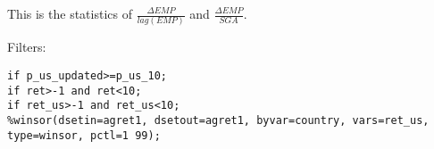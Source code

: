 





\thispagestyle{fancy}

\newcommand{\code}{\texttt}
\newcommand*{\Commonpath}{20181227}

This is the statistics of $\frac{\Delta EMP}{lag(EMP)}$ and $\frac{\Delta EMP}{SGA}$.

Filters:

\code{if p\_us\_updated>=p\_us\_10;} \\
\code{if ret>-1 and ret<10;} \\
\code{if ret\_us>-1 and ret\_us<10;} \\
\code{\%winsor(dsetin=agret1, dsetout=agret1, byvar=country, vars=ret\_us, type=winsor, pctl=1 99);}






